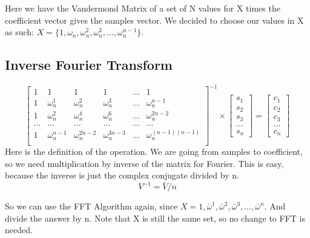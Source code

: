 Here we have the Vandermond Matrix of a set of N values for X times the coefficient vector gives the samples vector. We decided to choose our values in X as such:
$ X = \{ 1, \omega_n, \omega_n^2, \omega_n^3, ..., \omega_n^{n-1} \} $.

\subsection{Inverse Fourier Transform}

\begin{equation}
  \begin{bmatrix}
    1   & 1              & 1               & 1               & ... & 1                     \\
    1   & \omega_n^1     & \omega_n^2      & \omega_n^3      & ... & \omega_n^{ n-1}       \\
    1   & \omega_n^2     & \omega_n^4      & \omega_n^6      & ... & \omega_n^{2n-2}       \\
    ... & ...            & ...             & ...             & ... & ...                   \\
    1   & \omega_n^{n-1} & \omega_n^{2n-2} & \omega_n^{3n-3} & ... & \omega_n^{(n-1)(n-1)} \\
  \end{bmatrix} ^{-1} \times
  \begin{bmatrix}
    s_1 \\ s_2 \\ s_3 \\ ... \\ s_n
  \end{bmatrix} =
  \begin{bmatrix}
    c_1 \\ c_2 \\ c_3 \\ ... \\ c_n
  \end{bmatrix}
\end{equation}
Here is the definition of the operation. We are going from samples to coefficient, so we need multiplication by inverse of the matrix for Fourier. This is easy, because the inverse is just the complex conjugate divided by n.
\begin{equation}
  V^{-1} = \bar{V} / n
\end{equation}

So we can use the FFT Algorithm again, since $X = {1, \bar{\omega}^1, \bar{\omega}^2, \bar{\omega}^3, ..., \bar{\omega}^n}$. And divide the answer by n. Note that X is still the same set, so no change to FFT is needed.


